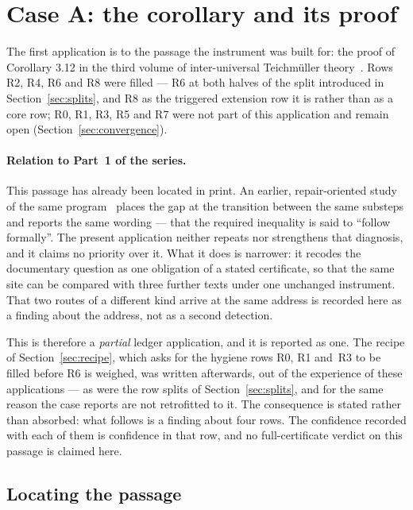 \documentclass[11pt,a4paper]{article}
\theoremstyle{definition}
\begin{document}
\section{Case A: the corollary and its proof}
\label{sec:caseA}

The first application is to the passage the instrument was built for: the proof
of Corollary 3.12 in the third volume of inter-universal Teichmüller theory~\cite{Mochizuki2021c}. Rows R2, R4, R6 and R8 were filled --- R6 at both halves
of the split introduced in Section~\ref{sec:splits}, and R8 as the triggered
extension row it is rather than as a core row; R0, R1, R3, R5 and R7
were not part of this application and remain open
(Section~\ref{sec:convergence}).

\paragraph{Relation to Part~1 of the series.} This passage has already been located
in print. An earlier, repair-oriented study of the same program~\cite{GeigerGap2026}
places the gap at the transition between the same substeps and reports the same
wording --- that the required inequality is said to ``follow formally''. The present
application neither repeats nor strengthens that diagnosis, and it claims no
priority over it. What it does is narrower: it recodes the documentary question as
one obligation of a stated certificate, so that the same site can be compared with
three further texts under one unchanged instrument. That two routes of a different
kind arrive at the same address is recorded here as a finding about the address, not
as a second detection.

This is therefore a \emph{partial} ledger application, and it is reported as one.
The recipe of Section~\ref{sec:recipe}, which asks for the hygiene rows R0, R1
and~R3 to be filled before R6 is weighed, was written afterwards, out of the
experience of these applications --- as were the row splits of
Section~\ref{sec:splits}, and for the same reason the case reports are not
retrofitted to it. The consequence is stated rather than absorbed: what follows is
a finding about four rows. The confidence recorded with each of them is confidence
in that row, and no full-certificate verdict on this passage is claimed here.

\subsection{Locating the passage}
\end{document}
